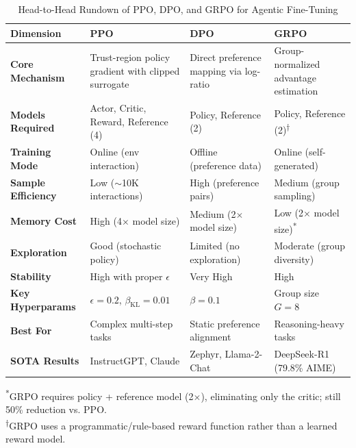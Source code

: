 \documentclass[12pt,a4paper]{report}
\theoremstyle{definition}
\begin{document}
\begin{table}[h]
\centering
\caption{Head-to-Head Rundown of PPO, DPO, and GRPO for Agentic Fine-Tuning}
\label{tab:algorithm_comparison}
\small
\begin{tabular}{@{}p{2.8cm}p{3.8cm}p{3.8cm}p{3.8cm}@{}}
\toprule
\textbf{Dimension} & \textbf{PPO} & \textbf{DPO} & \textbf{GRPO} \\
\midrule
\textbf{Core Mechanism} & Trust-region policy gradient with clipped surrogate & Direct preference mapping via log-ratio &
 Group-normalized advantage estimation \\
\addlinespace
\textbf{Models Required} & Actor, Critic, Reward, Reference (4) & Policy, Reference (2) & Policy, Reference (2)\textsuperscript{$\dagger$} \\
\addlinespace
\textbf{Training Mode} & Online (env interaction) & Offline (preference data) & Online (self-generated) \\
\addlinespace
\textbf{Sample Efficiency} & Low ($\sim$10K interactions) & High (preference pairs) & Medium (group sampling) \\
\addlinespace
\textbf{Memory Cost} & High (4$\times$ model size) & Medium (2$\times$ model size) & Low (2$\times$ model size)\textsuperscript{*} \\
\addlinespace
\textbf{Exploration} & Good (stochastic policy) & Limited (no exploration) & Moderate (group diversity) \\
\addlinespace
\textbf{Stability} & High with proper $\epsilon$ & Very High & High \\
\addlinespace
\textbf{Key Hyperparams} & $\epsilon=0.2$, $\beta_{\text{KL}}=0.01$ & $\beta=0.1$ & Group size $G=8$ \\
\addlinespace
\textbf{Best For} & Complex multi-step tasks & Static preference alignment & Reasoning-heavy tasks \\
\addlinespace
\textbf{SOTA Results} & InstructGPT, Claude & Zephyr, Llama-2-Chat & DeepSeek-R1 (79.8\% AIME) \\
\bottomrule
\end{tabular}

\vspace{0.2cm}
\small\textsuperscript{*}GRPO requires policy + reference model (2$\times$), eliminating only the critic; still 50\% reduction vs. PPO.\\
\textsuperscript{$\dagger$}GRPO uses a programmatic/rule-based reward function rather than a learned reward model.
\end{table}
\end{document}
